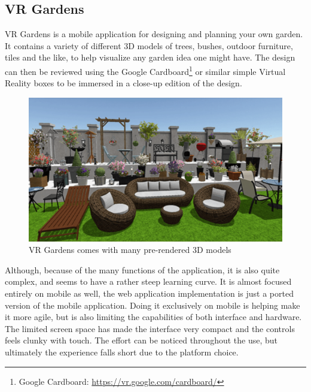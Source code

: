 		\subsection{VR Gardens}
			VR Gardens is a mobile application for designing and planning your own garden. It contains a variety of different 3D models of trees, bushes, outdoor furniture, tiles and the like, to help visualize any garden idea one might have. The design can then be reviewed using the Google Cardboard\footnote{Google Cardboard: \url{https://vr.google.com/cardboard/}} or similar simple Virtual Reality boxes to be immersed in a close-up edition of the design.
			\begin{figure}[H]
				\centering
				\includegraphics[width=0.6\linewidth]{figure/Analysis/vrgardens}
				\caption{VR Gardens comes with many pre-rendered 3D models}
				\label{fig:vrgardens}
			\end{figure}
			Although, because of the many functions of the application, it is also quite complex, and seems to have a rather steep learning curve. It is almost focused entirely on mobile as well, the web application implementation is just a ported version of the mobile application. Doing it exclusively on mobile is helping make it more agile, but is also limiting the capabilities of both interface and hardware. The limited screen space has made the interface very compact and the controls feels clunky with touch. The effort can be noticed throughout the use, but ultimately the experience falls short due to the 	platform choice.
			

